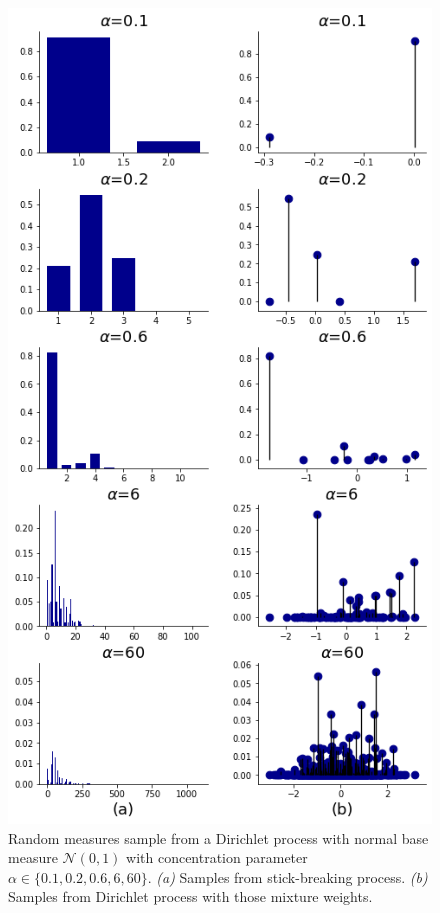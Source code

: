 \documentclass{article}
\begin{document}
\begin{figure}[h]
\centering
\includegraphics[scale=0.3]{img/dp_samples.png}  
\caption{Random measures sample from a Dirichlet process with normal base measure $\mathcal{N}(0,1)$ with concentration parameter $\alpha\in\{0.1, 0.2, 0.6, 6, 60\}$. \textit{(a)} Samples from stick-breaking process. \textit{(b)} Samples from Dirichlet process with those mixture weights.}
\end{figure}
\end{document}
